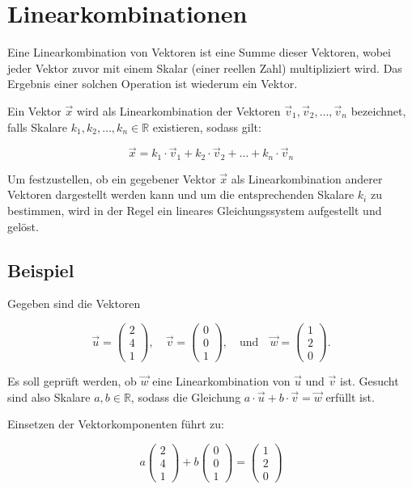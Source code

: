 \chapter{Linearkombinationen}

Eine Linearkombination von Vektoren ist eine Summe dieser Vektoren, wobei jeder Vektor zuvor mit einem Skalar (einer reellen Zahl) multipliziert wird. Das Ergebnis einer solchen Operation ist wiederum ein Vektor.

Ein Vektor $\vec{x}$ wird als Linearkombination der Vektoren $\vec{v}_1, \vec{v}_2, \ldots, \vec{v}_n$ bezeichnet, falls Skalare $k_1, k_2, \ldots, k_n \in \mathbb{R}$ existieren, sodass gilt:

\[
    \vec{x} = k_1 \cdot \vec{v}_1 + k_2 \cdot \vec{v}_2 + \ldots + k_n \cdot \vec{v}_n
\]

Um festzustellen, ob ein gegebener Vektor $\vec{x}$ als Linearkombination anderer Vektoren dargestellt werden kann und um die entsprechenden Skalare $k_i$ zu bestimmen, wird in der Regel ein lineares Gleichungssystem aufgestellt und gelöst.

\section{Beispiel}

Gegeben sind die Vektoren

\[
    \vec{u} = \begin{pmatrix} 2 \\ 4 \\ 1 \end{pmatrix}, \quad \vec{v} = \begin{pmatrix} 0 \\ 0 \\ 1 \end{pmatrix}, \quad \text{und} \quad \vec{w} = \begin{pmatrix} 1 \\ 2 \\ 0 \end{pmatrix}.
\]

Es soll geprüft werden, ob $\vec{w}$ eine Linearkombination von $\vec{u}$ und $\vec{v}$ ist. Gesucht sind also Skalare $a, b \in \mathbb{R}$, sodass die Gleichung $a \cdot \vec{u} + b \cdot \vec{v} = \vec{w}$ erfüllt ist.

Einsetzen der Vektorkomponenten führt zu:

\[
    a \begin{pmatrix} 2 \\ 4 \\ 1 \end{pmatrix} + b \begin{pmatrix} 0 \\ 0 \\ 1 \end{pmatrix} = \begin{pmatrix} 1 \\ 2 \\ 0 \end{pmatrix}
\]

